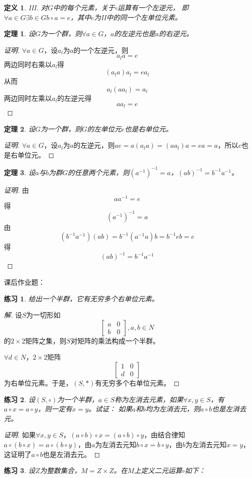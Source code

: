 \documentclass{article}
\newtheorem{Def}{定义}
\newtheorem{Thm}{定理}
\newtheorem{Exercise}{练习}
\begin{document}
\begin{CJK*}{UTF8}{gbsn}
\begin{Def}
    III. 对$G$中的每个元素，关于$\circ$运算有一个左逆元，
    即$\forall a\in G \exists b\in G b\circ a = e$，其中$e$为II中的同一个左单位元素。
  \end{Def}
  \begin{Thm}
    设$G$为一个群，则$\forall a\in G$，$a$的左逆元也是$a$的右逆元。
  \end{Thm}
  \begin{proof}[证明]
    $\forall a\in G$，设$a_l$为$a$的一个左逆元，则
    \[a_la=e\]
    两边同时右乘以$a_l$得
    \[(a_la)a_l=ea_l\]
    从而
    \[a_l(aa_l)=a_l\]
    两边同时左乘以$a_l$的左逆元得
    \[aa_l=e\]
  \end{proof}
  \begin{Thm}
    设$G$为一个群，则$G$的左单位元$e$也是右单位元。
  \end{Thm}
  \begin{proof}[证明]
    $\forall a\in G$，设$a_l$为$a$的左逆元，则$ae=a(a_la)=(aa_l)a=ea=a$，所以$e$也是右单位元。
  \end{proof}
  \begin{Thm}
    设$a$与$b$为群$G$的任意两个元素，则$(a^{-1})^{-1}=a$，$(ab)^{-1}=b^{-1}a^{-1}$。
  \end{Thm}
  \begin{proof}[证明]
    由\[aa^{-1}=e\]
    得\[(a^{-1})^{-1}=a\]
  由\[(b^{-1}a^{-1})(ab)=b^{-1}(a^{-1}a)b=b^{-1}eb=e\]
  得\[(ab)^{-1}=b^{-1}a^{-1}\]
  \end{proof}
    




  课后作业题：

\begin{Exercise}
  给出一个半群，它有无穷多个右单位元素。
\end{Exercise}
\begin{proof}[解]
  设$S$为一切形如
  \[\begin{bmatrix}
    a&0\\
    b&0
  \end{bmatrix},a,b\in N\]
的$2\times 2$矩阵之集，则$S$对矩阵的乘法构成一个半群。

$\forall d\in N$，$2\times 2$矩阵
\[\begin{bmatrix}1&0\\d&0\end{bmatrix}\]
为右单位元素。于是，$(S,*)$有无穷多个右单位元素。  
\end{proof}
\begin{Exercise}
  设$(S,\circ)$为一个半群，$a\in S$称为左消去元素，如果$\forall x, y\in S$，有$a\circ x=a\circ y$，则一定有$x=y$。试证：
  如果$a$和$b$均为左消去元，则$a\circ b$也是左消去元。
\end{Exercise}
\begin{proof}[证明]
  如果$\forall x, y\in S$，$(a\circ b)\circ x=(a\circ b)\circ y$，由结合律知$a\circ (b\circ x)=a\circ (b\circ y)$，由$a$为左消去元知$b\circ x=b\circ y$，由$b$为左消去元知$x=y$，这证明了$a\circ b$也是左消去元。
\end{proof}
\begin{Exercise}
  设$Z$为整数集合，$M=Z\times Z$。在$M$上定义二元运算$\circ$如下：


\end{Exercise}
\end{CJK*}
\end{document}
